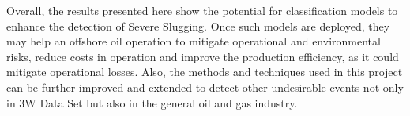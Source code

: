 \documentclass{article}
\begin{document}
Overall, the results presented here show the potential for classification models to enhance the detection of Severe Slugging. Once such models are deployed, they may help an offshore oil operation to mitigate operational and environmental risks, reduce costs in operation and improve the production efficiency, as it could mitigate operational losses. Also, the methods and techniques used in this project can be further improved and extended to detect other undesirable events not only in 3W Data Set but also in the general oil and gas industry.

\printbibliography
\end{document}
